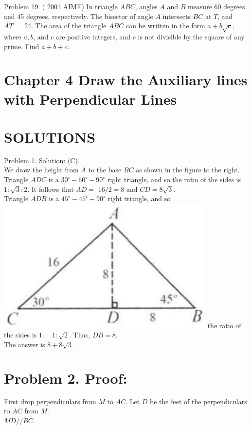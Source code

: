 \documentclass[10pt]{article}
\begin{document}
Problem 19. ( 2001 AIME) In triangle \(A B C\), angles \(A\) and \(B\) measure 60 degrees and 45 degrees, respectively. The bisector of angle \(A\) intersects \(B C\) at \(T\), and \(A T=\) 24. The area of the triangle \(A B C\) can be written in the form \(a+b \sqrt{c}\), where \(a, b\), and \(c\) are positive integers, and \(c\) is not divisible by the square of any prime. Find \(a+b+c\).

\section*{Chapter 4 Draw the Auxiliary lines with Perpendicular Lines}
\section*{SOLUTIONS}
Problem 1. Solution: (C).\\
We draw the height from \(A\) to the base \(B C\) as shown in the figure to the right.\\
Triangle \(A D C\) is a \(30^{\circ}-60^{\circ}-90^{\circ}\) right triangle, and so the ratio of the sides is \(1: \sqrt{3}: 2\). It follows that \(A D=\) \(16 / 2=8\) and \(C D=8 \sqrt{3}\).\\
Triangle \(A D B\) is a \(45^{\circ}-45^{\circ}-90^{\circ}\) right triangle, and so\\
\includegraphics[max width=\textwidth]{2025_04_17_97bc1f7e44d93c271a88g-092} the ratio of the sides is \(1: \quad 1: \sqrt{2}\). Thus, \(D B=8\).\\
The answer is \(8+8 \sqrt{3}\).

\section*{Problem 2. Proof:}
First drop perpendiculars from \(M\) to \(A C\). Let \(D\) be the feet of the perpendiculars to \(A C\) from \(M\).\\
\(M D / / B C\).
\end{document}
